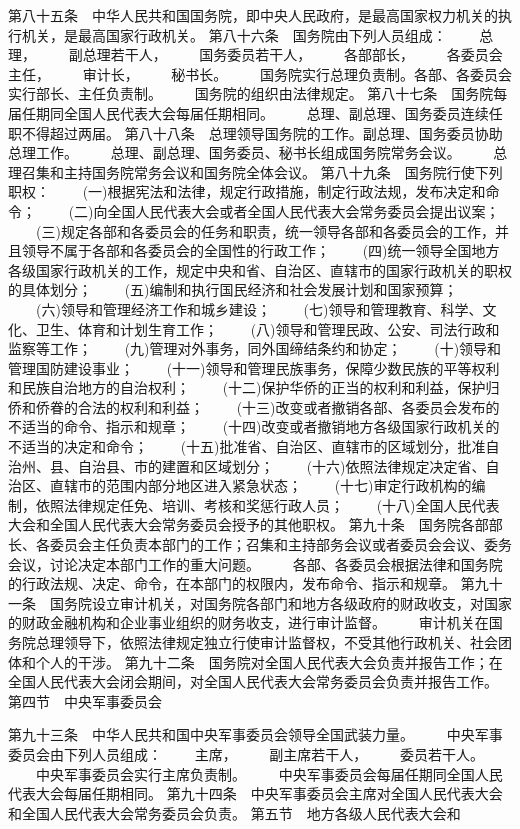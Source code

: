      第八十五条　中华人民共和国国务院，即中央人民政府，是最高国家权力机关的执行机关，是最高国家行政机关。
     第八十六条　国务院由下列人员组成：
　　总理，
　　副总理若干人，
　　国务委员若干人，
　　各部部长，
　　各委员会主任，
　　审计长，
　　秘书长。
　　国务院实行总理负责制。各部、各委员会实行部长、主任负责制。
　　国务院的组织由法律规定。
     第八十七条　国务院每届任期同全国人民代表大会每届任期相同。
　　总理、副总理、国务委员连续任职不得超过两届。
     第八十八条　总理领导国务院的工作。副总理、国务委员协助总理工作。
　　总理、副总理、国务委员、秘书长组成国务院常务会议。
　　总理召集和主持国务院常务会议和国务院全体会议。
     第八十九条　国务院行使下列职权：
　　(一)根据宪法和法律，规定行政措施，制定行政法规，发布决定和命令；
　　(二)向全国人民代表大会或者全国人民代表大会常务委员会提出议案；
　　(三)规定各部和各委员会的任务和职责，统一领导各部和各委员会的工作，并且领导不属于各部和各委员会的全国性的行政工作；
　　(四)统一领导全国地方各级国家行政机关的工作，规定中央和省、自治区、直辖市的国家行政机关的职权的具体划分；
　　(五)编制和执行国民经济和社会发展计划和国家预算；
　　(六)领导和管理经济工作和城乡建设；
　　(七)领导和管理教育、科学、文化、卫生、体育和计划生育工作；
　　(八)领导和管理民政、公安、司法行政和监察等工作；
　　(九)管理对外事务，同外国缔结条约和协定；
　　(十)领导和管理国防建设事业；
　　(十一)领导和管理民族事务，保障少数民族的平等权利和民族自治地方的自治权利；
　　(十二)保护华侨的正当的权利和利益，保护归侨和侨眷的合法的权利和利益；
　　(十三)改变或者撤销各部、各委员会发布的不适当的命令、指示和规章；
　　(十四)改变或者撤销地方各级国家行政机关的不适当的决定和命令；
　　(十五)批准省、自治区、直辖市的区域划分，批准自治州、县、自治县、市的建置和区域划分；
　　(十六)依照法律规定决定省、自治区、直辖市的范围内部分地区进入紧急状态；
　　(十七)审定行政机构的编制，依照法律规定任免、培训、考核和奖惩行政人员；
　　(十八)全国人民代表大会和全国人民代表大会常务委员会授予的其他职权。
     第九十条　国务院各部部长、各委员会主任负责本部门的工作；召集和主持部务会议或者委员会会议、委务会议，讨论决定本部门工作的重大问题。
　　各部、各委员会根据法律和国务院的行政法规、决定、命令，在本部门的权限内，发布命令、指示和规章。
     第九十一条　国务院设立审计机关，对国务院各部门和地方各级政府的财政收支，对国家的财政金融机构和企业事业组织的财务收支，进行审计监督。
 　　审计机关在国务院总理领导下，依照法律规定独立行使审计监督权，不受其他行政机关、社会团体和个人的干涉。
     第九十二条　国务院对全国人民代表大会负责并报告工作；在全国人民代表大会闭会期间，对全国人民代表大会常务委员会负责并报告工作。
第四节　中央军事委员会

    第九十三条　中华人民共和国中央军事委员会领导全国武装力量。
　　中央军事委员会由下列人员组成：
　　主席，
　　副主席若干人，
　　委员若干人。
　　中央军事委员会实行主席负责制。
　　中央军事委员会每届任期同全国人民代表大会每届任期相同。
     第九十四条　中央军事委员会主席对全国人民代表大会和全国人民代表大会常务委员会负责。
第五节　地方各级人民代表大会和

